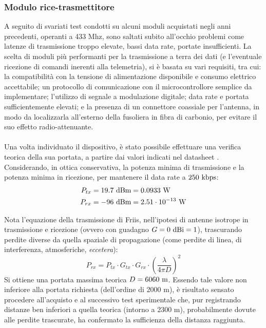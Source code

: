 \documentclass[12pt]{article}
\begin{document}
\subsubsection{Modulo rice-trasmettitore}
A seguito di svariati test condotti su alcuni moduli acquistati negli anni precedenti, operanti a 433 Mhz, sono saltati subito all'occhio problemi come latenze di trasmissione troppo elevate, bassi data rate, portate insufficienti.
La scelta di moduli più performanti per la trasmissione a terra dei dati (e l'eventuale ricezione di comandi inerenti alla telemetria), si è basata su vari requisiti, tra cui: la compatibilità con la tensione di alimentazione disponibile e consumo elettrico accettabile; un protocollo di comunicazione con il microcontrollore semplice da implementare; l'utilizzo di segnale a modulazione digitale; data rate e portata  sufficientemente elevati; e la presenza di un connettore coassiale per l'antenna, in modo da localizzarla all'esterno della fusoliera in fibra di carbonio, per evitare il suo effetto radio-attenuante.
\\\\
Una volta individuato il dispositivo, è stato possibile effettuare una verifica teorica della sua portata, a partire dai valori indicati nel datasheet \cite{rf-datasheet}. Considerando, in ottica conservativa, la potenza minima di trasmissione e la potenza minima in ricezione, per mantenere il data rate a $250 \textnormal{ kbps}$:
\begin{equation}
\begin{split}
P_{tx} &= 19.7 \textnormal{ dBm} = 0.0933 \textnormal{ W} \\
P_{rx} &= -96 \textnormal{ dBm} = 2.51 \cdot 10^{-13} \textnormal{ W}
\end{split}
\end{equation}

\noindent
Nota l'equazione della trasmissione di Friis, nell'ipotesi di antenne isotrope in trasmissione e ricezione (ovvero con guadagno $G = 0 \textnormal{ dBi} = 1$), trascurando perdite diverse da quella spaziale di propagazione (come perdite di linea, di interferenza, atmosferiche, \textit{eccetera}):
\begin{equation}
P_{rx} = P_{tx} \cdot G_{tx} \cdot G_{rx} \cdot \left(\frac{\lambda}{4 \pi D}\right)^2
\end{equation}
Si ottiene una portata massima teorica $D = 6060 \textnormal{ m}$. Essendo tale valore non inferiore alla portata richiesta (dell'ordine di 2000 m), è risultato sensato procedere all'acquisto e al successivo test sperimentale che, pur registrando distanze ben inferiori a quella teorica (intorno a 2300 m), probabilmente dovute alle perdite trascurate, ha confermato la sufficienza della distanza raggiunta.
\end{document}
